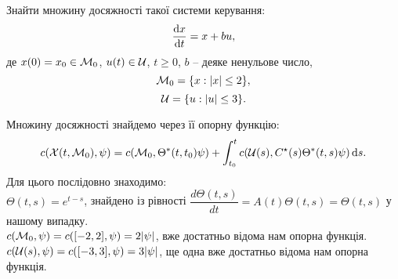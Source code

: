\begin{problem}
    Знайти множину досяжності такої системи керування:
    \[\frac{\mathop{}\!\mathrm{d} x}{\mathop{}\!\mathrm{d} t} = x + bu,\] 
    де $x(0) = x_0 \in \mathcal{M}_0$, $u(t)\in \mathcal{U}$, $t\ge0$, $b$ -- деяке ненульове число, 
    \[ \mathcal{M}_0 = \{ x : | x | \le 2 \}, \]
    \[ \mathcal{U} = \{ u : |u| \le 3 \}. \]
\end{problem}

\begin{solution}
    Множину досяжності знайдемо через її опорну функцію: 
    \[ c(\mathcal{X}(t, \mathcal{M}_0), \psi) = c(\mathcal{M}_0, \Theta^*(t, t_0) \psi) + \int_{t_0}^t c(\mathcal{U}(s), C^\star(s) \Theta^*(t, s)\psi) \mathop{}\!\mathrm{d} s. \]
    Для цього послідовно знаходимо: \\
    
    $\Theta(t, s) = e^{t-s}$, знайдено із рівності $\dfrac{d\Theta(t,s)}{dt} = A(t)\Theta(t,s) = \Theta(t,s)$ у нашому випадку. \\
    
    $c(\mathcal{M}_0, \psi) = c([-2, 2], \psi) = 2 |\psi|$, вже достатньо відома нам опорна функція. \\
    
    $c(\mathcal{U}(s), \psi) = c([-3, 3], \psi) = 3 |\psi|$, ще одна вже достатньо відома нам опорна функція. \\
    
    

\end{solution}
